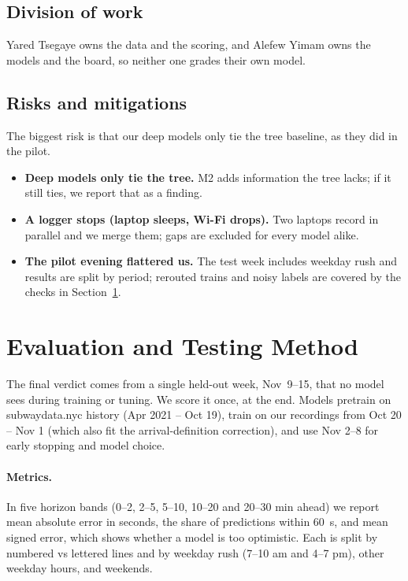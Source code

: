 \documentclass[10pt,letterpaper,twocolumn]{article}
\begin{document}
\subsection{Division of work}

Yared Tsegaye owns the data and the scoring, and Alefew Yimam owns the models and the board, so neither one grades their own model.

\subsection{Risks and mitigations}

The biggest risk is that our deep models only tie the tree baseline, as they did in the pilot.

\begin{itemize}
  \item \textbf{Deep models only tie the tree.} M2 adds information the tree lacks; if it still ties, we report that as a finding.
  \item \textbf{A logger stops (laptop sleeps, Wi-Fi drops).} Two laptops record in parallel and we merge them; gaps are excluded for every model alike.
  \item \textbf{The pilot evening flattered us.} The test week includes weekday rush and results are split by period; rerouted trains and noisy labels are covered by the checks in Section~\ref{sec:eval}.
\end{itemize}

\section{Evaluation and Testing Method}
\label{sec:eval}

The final verdict comes from a single held-out week, Nov~\mbox{9--15}, that no model sees during training or tuning. We score it once, at the end. Models pretrain on subwaydata.nyc history (Apr 2021 -- Oct 19), train on our recordings from Oct 20 -- Nov 1 (which also fit the arrival-definition correction), and use Nov 2--8 for early stopping and model choice.

\paragraph{Metrics.} In five horizon bands (0--2, 2--5, 5--10, 10--20 and 20--30 min ahead) we report mean absolute error in seconds, the share of predictions within 60~s, and mean signed error, which shows whether a model is too optimistic. Each is split by numbered vs lettered lines and by weekday rush (7--10 am and 4--7 pm), other weekday hours, and weekends.
\end{document}

